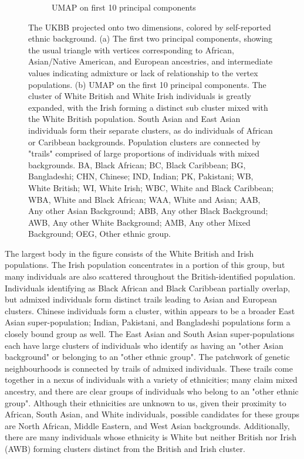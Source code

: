 \documentclass[12pt]{pnas-new}
\begin{document}
\begin{figure}
\begin{subfigure}{.5\columnwidth}
\caption{UMAP on first 10 principal components}%
\label{fig:umap_ukbb_pc10}%
\end{subfigure}%
\caption{The UKBB projected onto two dimensions, colored by self-reported ethnic background. (a) The first two principal components, showing the usual triangle with vertices corresponding to African, Asian/Native American, and European ancestries, and intermediate values indicating admixture or lack of relationship to the vertex populations. (b) UMAP on the first 10 principal components. The cluster of White British and White Irish individuals is greatly expanded, with the Irish forming a distinct sub cluster mixed with the White British population. South Asian and East Asian individuals form their separate clusters, as do individuals of African or Caribbean backgrounds. Population clusters are connected by "trails" comprised of large proportions of individuals with mixed backgrounds.
BA, Black African; 
BC, Black Caribbean; 
BG, Bangladeshi; 
CHN, Chinese; 
IND, Indian;
PK, Pakistani;
WB, White British;
WI, White Irish;
WBC, White and Black Caribbean; 
WBA, White and Black African; 
WAA, White and Asian;
AAB, Any other Asian Background; 
ABB, Any other Black Background;
AWB, Any other White Background;
AMB, Any other Mixed Background;
OEG, Other ethnic group. 
}
\label{fig:fig_ukbb}
\end{figure}

The largest body in the figure consists of the White British and Irish populations. The Irish population concentrates in a portion of this group, but many individuals are also scattered throughout the British-identified population. Individuals identifying as Black African and Black Caribbean partially overlap, but admixed individuals form distinct trails leading to Asian and European clusters. Chinese individuals form a cluster, within appears to be a broader East Asian super-population; Indian, Pakistani, and Bangladeshi populations form a closely bound group as well. The East Asian and South Asian super-populations each have large clusters of individuals who identify as having an "other Asian background" or belonging to an "other ethnic group". The patchwork of genetic neighbourhoods is connected by trails of admixed individuals. These trails come together in a nexus of individuals with a variety of ethnicities; many claim mixed ancestry, and there are clear groups of individuals who belong to an "other ethnic group". Although their ethnicities are unknown to us, given their proximity to African, South Asian, and White individuals, possible candidates for these groups are North African, Middle Eastern, and West Asian backgrounds. Additionally, there are many individuals whose ethnicity is White but neither British nor Irish (AWB) forming clusters distinct from the British and Irish cluster.
\end{document}
